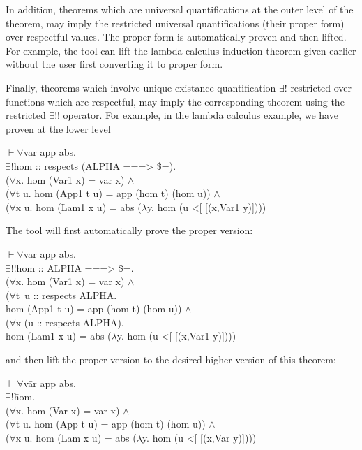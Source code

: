 \documentclass[envcountsame,runningheads]{llncs}
\begin{document}
In addition, theorems which are universal quantifications
at the outer level of the theorem, may
imply the restricted universal quantifications (their proper form)
over respectful values. 
The proper form is automatically proven and then lifted.
For example, the tool can lift the 
lambda calculus induction theorem given earlier without the user first
converting it to proper form.

Finally, theorems which involve unique existance
quantification $\exists$! restricted over functions which are respectful,
may imply the corresponding theorem using the
restricted $\exists$!!
operator.  For example, in the lambda 
calculus example, we have proven
at the lower level
{\tt \begin{tabbing}
 $\vdash \forall$v\=ar app abs. \\
\>    $\exists !$\=hom :: respects (ALPHA ===> \$=). \\
\>\>    ($\forall$x. hom (Var1 x) = var x) $\wedge$ \\
\>\>    ($\forall$t u. hom (App1 t u) = app (hom t) (hom u)) $\wedge$ \\
\>\>    ($\forall$x u. hom (Lam1 x u) = abs ($\lambda$y. hom (u <[ [(x,Var1 y)])))
\end{tabbing}}

\noindent
The tool will first automatically prove the proper version:
{\tt \begin{tabbing}
 $\vdash \forall$v\=ar app abs. \\
\>    $\exists !!$\=hom :: ALPHA ===> \$=. \\
\>\>    ($\forall$x. hom (Var1 x) = var x) $\wedge$ \\
\>\>    ($\forall$t\=\ u :: respects ALPHA. \\
\>\>\>     hom (App1 t u) = app (hom t) (hom u)) $\wedge$ \\
\>\>    ($\forall$x (u :: respects ALPHA). \\
\>\>\>     hom (Lam1 x u) = abs ($\lambda$y. hom (u <[ [(x,Var1 y)])))
\end{tabbing}}

\noindent
and then lift the proper version to the desired higher version of this theorem:
{\tt \begin{tabbing}
 $\vdash \forall$v\=ar app abs. \\
\>    $\exists !$\=hom. \\
\>\>    ($\forall$x. hom (Var x) = var x) $\wedge$ \\
\>\>    ($\forall$t u. hom (App t u) = app (hom t) (hom u)) $\wedge$ \\
\>\>    ($\forall$x u. hom (Lam x u) = abs ($\lambda$y. hom (u <[ [(x,Var y)])))
\end{tabbing}}
\end{document}
